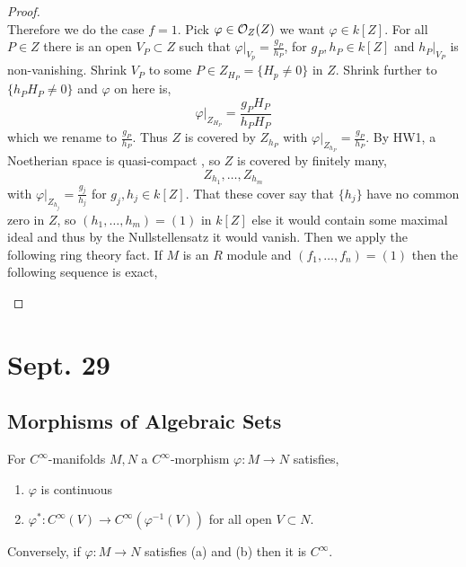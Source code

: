 \documentclass[12pt]{article}
\begin{document}
\begin{proof}
\bigskip\\
Therefore we do the case $f = 1$. Pick $\varphi \in \mathcal{O}_{Z}(Z)$ we want $\varphi \in k[Z]$. For all $P \in Z$ there is an open $V_P \subset Z$ such that $\varphi|_{V_p} = \frac{g_P}{h_P}$, for $g_P, h_P \in k[Z]$ and $h_P|_{V_P}$ is non-vanishing. Shrink $V_P$ to some $P \in Z_{H_P} = \{ H_p \neq 0 \}$ in $Z$. Shrink further to $\{ h_P H_P \neq 0 \}$ and $\varphi$ on here is,
\[ \varphi|_{Z_{H_P}} = \frac{g_P H_P}{h_P H_P} \]
which we rename to $\frac{g_P}{h_P}$. Thus $Z$ is covered by $Z_{h_P}$ with $\varphi|_{Z_{h_P}} = \frac{g_P}{h_P}$. By HW1, a Noetherian space is quasi-compact , so $Z$ is covered by finitely many,
\[ Z_{h_1}, \dots, Z_{h_m} \]
with $\varphi|_{Z_{h_j}} = \frac{g_j}{h_j}$ for $g_j, h_j \in k[Z]$. That these cover say that $\{ h_j \}$ have no common zero in $Z$, so $(h_1, \dots, h_m) = (1)$ in $k[Z]$ else it would contain some maximal ideal and thus by the Nullstellensatz it would vanish. Then we apply the following ring theory fact. If $M$ is an $R$ module and $(f_1, \dots, f_n) = (1)$ then the following sequence is exact,
\begin{center}
\end{center}
\end{proof}

\section{Sept. 29}

\subsection{Morphisms of Algebraic Sets}

For $C^\infty$-manifolds $M,N$ a $C^\infty$-morphism $\varphi : M \to N$ satisfies,
\begin{enumerate}
\item $\varphi$ is continuous
\item $\varphi^* : C^\infty(V) \to C^{\infty}(\varphi^{-1}(V))$ for all open $V \subset N$.
\end{enumerate}

\begin{prop}
Conversely, if $\varphi : M \to N$ satisfies (a) and (b) then it is $C^\infty$.
\end{prop}
\end{document}
